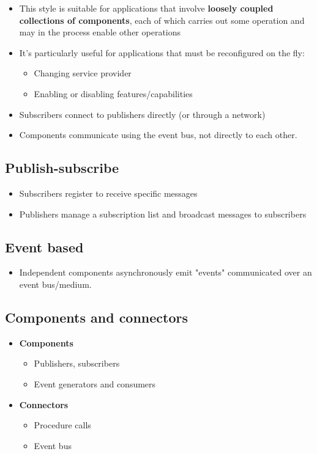 \documentclass[12pt]{book}
\begin{document}
\begin{itemize}
    \item This style is suitable for applications that involve \textbf{loosely coupled collections of components}, each of which carries out some operation and may in the process enable other operations
    \item It's particularly useful for applications that must be reconfigured on the fly:
    \begin{itemize}
        \item Changing service provider
        \item Enabling or disabling features/capabilities
    \end{itemize} 

    \item Subscribers connect to publishers directly (or through a network)
    \item Components communicate using the event bus, not directly to each other.
\end{itemize}

\subsection{Publish-subscribe}
\begin{itemize}
    \item Subscribers register to receive specific messages
    \item Publishers manage a subscription list and broadcast messages to subscribers
\end{itemize}

\subsection{Event based}

\begin{itemize}
    \item Independent components asynchronously emit "events" communicated over an event bus/medium.
\end{itemize}

\subsection{Components and connectors}

\begin{itemize}
    \item \textbf{Components}
    \begin{itemize}
        \item Publishers, subscribers
        \item Event generators and consumers
    \end{itemize}

    \item \textbf{Connectors}
    \begin{itemize}
        \item Procedure calls
        \item Event bus
    \end{itemize}
\end{itemize}
\end{document}
